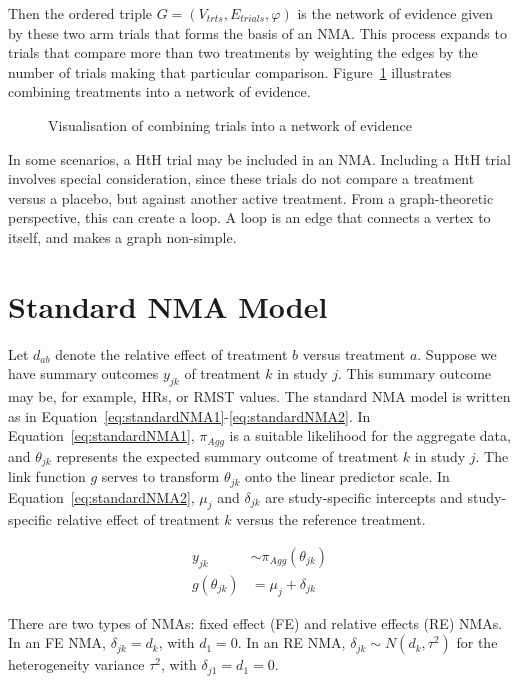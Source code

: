 Then the ordered triple $G = (V_{trts}, E_{trials}, \varphi)$ is the network of evidence given by these two arm trials that forms the basis of an NMA. This process expands to trials that compare more than two treatments by weighting the edges by the number of trials making that particular comparison. Figure~\ref{fig:comb_evi} illustrates combining treatments into a network of evidence.\\

\begin{figure}[h]
    \centering
    
    \caption{Visualisation of combining trials into a network of evidence}
    \label{fig:comb_evi}
\end{figure}

In some scenarios, a HtH trial may be included in an NMA. Including a HtH trial involves special consideration, since these trials do not compare a treatment versus a placebo, but against another active treatment. From a graph-theoretic perspective, this can create a loop. A loop is an edge that connects a vertex to itself, and makes a graph non-simple.

\section{Standard NMA Model}
Let $d_{ab}$ denote the relative effect of treatment $b$ versus treatment $a$. Suppose we have summary outcomes $y_{jk}$ of treatment $k$ in study $j$. This summary outcome may be, for example, HRs, or RMST values. The standard NMA model is written as in Equation~\ref{eq:standardNMA1}-\ref{eq:standardNMA2}. In Equation~\ref{eq:standardNMA1}, $\pi_{Agg}$ is a suitable likelihood for the aggregate data, and $\theta_{jk}$ represents the expected summary outcome of treatment $k$ in study $j$. The link function $g$ serves to transform $\theta_{jk}$ onto the linear predictor scale. In Equation~\ref{eq:standardNMA2}, $\mu_j$ and $\delta_{jk}$ are study-specific intercepts and study-specific relative effect of treatment $k$ versus the reference treatment.

\begin{align}
    y_{jk} &\sim \pi_{Agg}(\theta_{jk}) \label{eq:standardNMA1} \\
    g(\theta_{jk}) &= \mu_j + \delta_{jk} \label{eq:standardNMA2}
\end{align}

There are two types of NMAs: fixed effect (FE) and relative effects (RE) NMAs. In an FE NMA, $\delta_{jk} = d_k$, with $d_1 = 0$. In an RE NMA, $\delta_{jk} \sim N(d_k, \tau^2)$ for the heterogeneity variance $\tau^2$, with $\delta_{j1} = d_1 = 0$. \\

